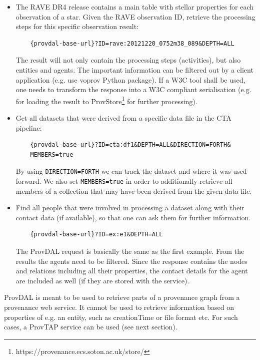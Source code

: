 \begin{itemize}
\item The RAVE DR4 release contains a main table with stellar properties for each observation of a star. Given the RAVE observation ID, retrieve the processing steps
for this specific observation result:

	\begin{verbatim}
	{provdal-base-url}?ID=rave:20121220_0752m38_089&DEPTH=ALL
	\end{verbatim}

The result will not only contain the processing steps (activities), but also entities and agents. The important information can be filtered out by a client application (e.g. use voprov Python package). If a W3C tool shall be used, one needs to transform the response into a W3C compliant serialisation (e.g. for loading the result to ProvStore\footnote{https://provenance.ecs.soton.ac.uk/store/} for further processing).

\item Get all datasets that were derived from a specific data file in the CTA pipeline:
	\begin{verbatim}
	{provdal-base-url}?ID=cta:df1&DEPTH=ALL&DIRECTION=FORTH&
	MEMBERS=true
	\end{verbatim}
	By using \texttt{DIRECTION=FORTH} we can track the dataset and where it was used forward. We also set \texttt{MEMBERS=true} in order to additionally retrieve all members of a collection that may have been derived from the given data file.

\item Find all people that were involved in processing a dataset along with their contact data (if available), so that one can ask them for further information.
	\begin{verbatim}
	{provdal-base-url}?ID=ex:e1&DEPTH=ALL
	\end{verbatim}
 	The ProvDAL request is basically the same as the first example. From the results the agents need to be filtered.
 	Since the response contains the nodes and relations including all their properties, the contact details for the agent are included as well (if they are stored with the service).
\end{itemize}

ProvDAL is meant to be used to retrieve parts of a provenance graph from a provenance web service. It cannot be used to retrieve information based on properties of e.g. an entity, such as creationTime or file format etc. For such cases, a ProvTAP service can be used (see next section).


